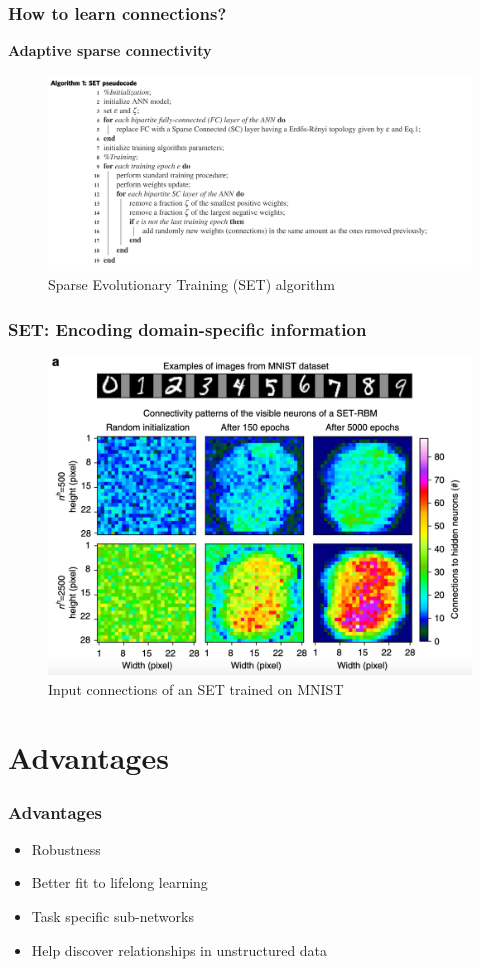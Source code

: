 \documentclass{beamer}
\begin{document}
  \begin{frame}
    \frametitle{How to learn connections?}
    \textbf{Adaptive sparse connectivity}
    \begin{figure}
        \centering
        \includegraphics[width=\textwidth]{images/set_algo.png}
        \caption{Sparse Evolutionary Training (SET) algorithm}
    \end{figure}
  \end{frame}
  
  \begin{frame}
    \frametitle{SET: Encoding domain-specific information}
    \begin{figure}
        \centering
        \includegraphics[width=.7\textwidth]{images/mnist_scl.png}
        \caption{Input connections of an SET trained on MNIST }
    \end{figure}
  \end{frame}

  
  \section{Advantages}
  \begin{frame}
    \frametitle{Advantages}
    \begin{itemize}
        \item Robustness 
        \item Better fit to lifelong learning 
        \item Task specific sub-networks 
        \item Help discover relationships in unstructured data
    \end{itemize}
  \end{frame}
  
\end{document}
